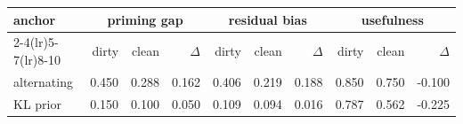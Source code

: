 \begin{tabular}{l rrr rrr rrr}
\toprule
anchor & \multicolumn{3}{c}{priming gap} & \multicolumn{3}{c}{residual bias} & \multicolumn{3}{c}{usefulness} \\
\cmidrule(lr){2-4}\cmidrule(lr){5-7}\cmidrule(lr){8-10}
 & dirty & clean & $\Delta$ & dirty & clean & $\Delta$ & dirty & clean & $\Delta$ \\
\midrule
alternating & 0.450 & 0.288 & 0.162 & 0.406 & 0.219 & 0.188 & 0.850 & 0.750 & -0.100 \\
KL prior & 0.150 & 0.100 & 0.050 & 0.109 & 0.094 & 0.016 & 0.787 & 0.562 & -0.225 \\
\bottomrule
\end{tabular}
